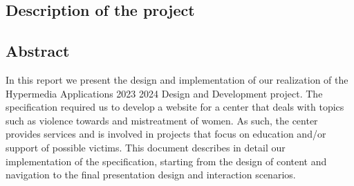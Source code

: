 \subsection{Description of the project}

\subsection{Abstract}
In this report we present the design and implementation of our realization of the Hypermedia Applications 2023 2024 Design and Development project.
The specification required us to develop a website for a center that deals with topics such as violence towards and mistreatment of women. As such,
the center provides services and is involved in projects that focus on education and/or support of possible victims. This document describes in detail
our implementation of the specification, starting from the design of content and navigation to the final presentation design and interaction scenarios.
